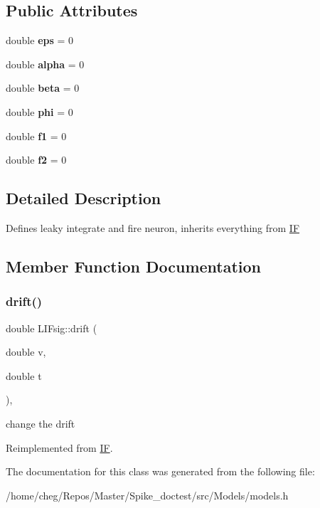 \subsection*{Public Attributes}
\begin{DoxyCompactItemize}
\item 
\mbox{\label{classLIFsig_a8991d6d8fce6f23da2d551a219834ad2}} 
double {\bfseries eps} = 0
\item 
\mbox{\label{classLIFsig_a61fa8f3255a816895cfa1e0f545e2ee0}} 
double {\bfseries alpha} = 0
\item 
\mbox{\label{classLIFsig_ae846c09d4330371323b38286482e7022}} 
double {\bfseries beta} = 0
\item 
\mbox{\label{classLIFsig_a1158407d1fdac8ea71d4140fb00be58f}} 
double {\bfseries phi} = 0
\item 
\mbox{\label{classLIFsig_ac7d353555d7b2a22b7f202e938ab8e1b}} 
double {\bfseries f1} = 0
\item 
\mbox{\label{classLIFsig_acc6889e36b038fd40eed1fed3954ffb1}} 
double {\bfseries f2} = 0
\end{DoxyCompactItemize}


\subsection{Detailed Description}
Defines leaky integrate and fire neuron, inherits everything from \hyperlink{classIF}{IF} 

\subsection{Member Function Documentation}
\mbox{\label{classLIFsig_a169dcb5d3704157102bbc725445cf0a5}} 
\subsubsection{\texorpdfstring{drift()}{drift()}}
{\footnotesize\ttfamily double L\+I\+Fsig\+::drift (\begin{DoxyParamCaption}\item[{double}]{v,  }\item[{double}]{t }\end{DoxyParamCaption})\hspace{0.3cm}{\ttfamily [inline]}, {\ttfamily [virtual]}}

change the drift 

Reimplemented from \hyperlink{classIF}{IF}.



The documentation for this class was generated from the following file\+:\begin{DoxyCompactItemize}
\item 
/home/cheg/\+Repos/\+Master/\+Spike\+\_\+doctest/src/\+Models/models.\+h\end{DoxyCompactItemize}
